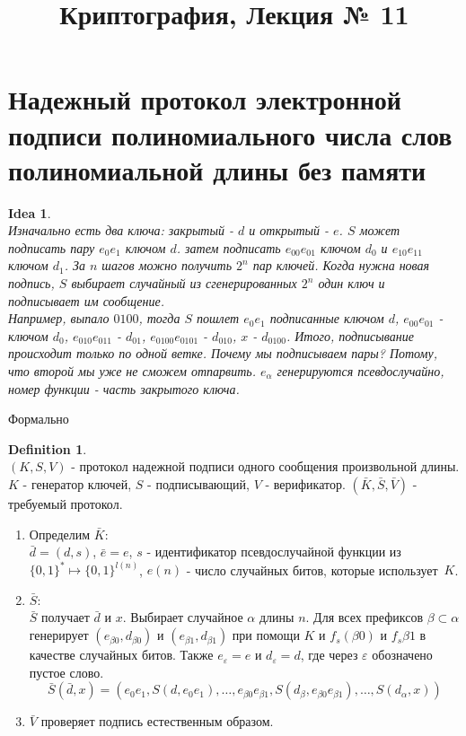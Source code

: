 \documentclass[a4paper]{article}
\title{Криптография, Лекция № 11}
\theoremstyle{definition}
\newtheorem{definition}{Definition}
\theoremstyle{plain}
\newtheorem{idea}{Idea}
\begin{document}
\maketitle

\section{Надежный протокол электронной подписи полиномиального числа слов полиномиальной длины без памяти}

\begin{idea}~\\
	Изначально есть два ключа: закрытый - $d$ и открытый - $e$.
	$S$ может подписать пару $e_0e_1$ ключом $d$.
	затем подписать $e_{00}e_{01}$ ключом $d_0$ и $e_{10}e_{11}$ ключом $d_1$.
	За $n$ шагов можно получить $2^n$ пар ключей.
	Когда нужна новая подпись, $S$ выбирает случайный из сгенерированных $2^n$ один ключ и 
	подписывает им сообщение.~\\
	
	\noindent Например, выпало $0100$, тогда $S$ пошлет $e_0e_1$ подписанные ключом $d$,
	$e_{00}e_{01}$ - ключом $d_0$, $e_{010}e_{011}$ - $d_{01}$, $e_{0100}e_{0101}$ - $d_{010}$,
	$x$ - $d_{0100}$. Итого, подписывание происходит только по одной ветке.
	Почему мы подписываем пары? Потому, что второй мы уже не сможем отпарвить.
	$e_{\alpha}$ генерируются псевдослучайно, номер функции - часть закрытого ключа.
\end{idea}

\noindent Формально
\begin{definition}~\\
	$(K, S, V)$ - протокол надежной подписи одного сообщения произвольной длины.
	$K$ - генератор ключей, $S$ - подписывающий, $V$ - верификатор.
	$(\bar{K}, \bar{S}, \bar{V})$ - требуемый протокол.
	\begin{enumerate}
		\item Определим $\bar{K}$:~\\
			$\bar{d} = (d, s)$, $\bar{e} = e$,
			$s$ - идентификатор псевдослучайной функции
			из $\{0, 1\}^{*} \mapsto \{0, 1\}^{l(n)}$,
			$e(n)$ - число случайных битов, которые использует~$K$.
		\item $\bar{S}$:~\\
			$\bar{S}$ получает $\bar{d}$ и $x$. Выбирает случайное $\alpha$ длины $n$.
			Для всех префиксов $\beta \subset \alpha$
			генерирует $(e_{\beta0}, d_{\beta0})$ и $(e_{\beta1}, d_{\beta1})$
			при помощи $K$ и $f_s(\beta0)$ и $f_s{\beta1}$ в качестве случайных битов.
			Также $e_{\varepsilon} = e$ и $d_{\varepsilon} = d$, где через $\varepsilon$
			обозначено пустое слово.
			$$
				\bar{S}(\bar{d}, x) = (e_0e_1, S(d, e_0e_1), \ldots, e_{\beta0}e_{\beta1}, S(d_{\beta}, e_{\beta0}e_{\beta1}), \ldots, S(d_{\alpha}, x))
			$$
		\item $\bar{V}$ проверяет подпись естественным образом.
	\end{enumerate}
\end{definition}
\end{document}
